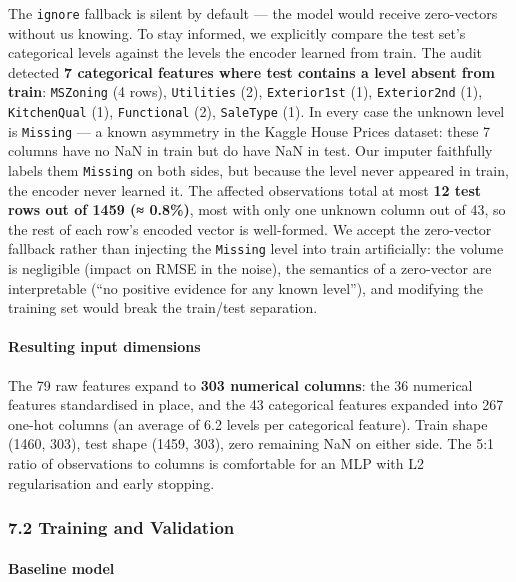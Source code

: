 The \texttt{\textquotesingle{}ignore\textquotesingle{}} fallback is
silent by default --- the model would receive zero-vectors without us
knowing. To stay informed, we explicitly compare the test set's
categorical levels against the levels the encoder learned from train.
The audit detected \textbf{7 categorical features where test contains a
level absent from train}: \texttt{MSZoning} (4 rows), \texttt{Utilities}
(2), \texttt{Exterior1st} (1), \texttt{Exterior2nd} (1),
\texttt{KitchenQual} (1), \texttt{Functional} (2), \texttt{SaleType}
(1). In every case the unknown level is
\texttt{\textquotesingle{}Missing\textquotesingle{}} --- a known
asymmetry in the Kaggle House Prices dataset: these 7 columns have no
NaN in train but do have NaN in test. Our imputer faithfully labels them
\texttt{\textquotesingle{}Missing\textquotesingle{}} on both sides, but
because the level never appeared in train, the encoder never learned it.
The affected observations total at most \textbf{12 test rows out of 1459
(≈ 0.8\%)}, most with only one unknown column out of 43, so the rest of
each row's encoded vector is well-formed. We accept the zero-vector
fallback rather than injecting the
\texttt{\textquotesingle{}Missing\textquotesingle{}} level into train
artificially: the volume is negligible (impact on RMSE in the noise),
the semantics of a zero-vector are interpretable (``no positive evidence
for any known level''), and modifying the training set would break the
train/test separation.

\paragraph{Resulting input dimensions}\label{resulting-input-dimensions}

The 79 raw features expand to \textbf{303 numerical columns}: the 36
numerical features standardised in place, and the 43 categorical
features expanded into 267 one-hot columns (an average of 6.2 levels per
categorical feature). Train shape (1460, 303), test shape (1459, 303),
zero remaining NaN on either side. The 5:1 ratio of observations to
columns is comfortable for an MLP with L2 regularisation and early
stopping.

\subsubsection{7.2 Training and
Validation}\label{training-and-validation}

\paragraph{Baseline model}\label{baseline-model}

